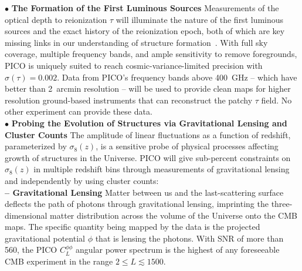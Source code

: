 \documentclass[PICOAPC.tex]{subfiles}
\begin{document}
 
$\bullet$ {\bf The Formation of the First Luminous Sources} \hspace{0.1in} \label{sec:luminoussources}  Measurements of the optical depth to reionization $\tau$ will illuminate the nature of the first luminous sources and the exact history of the reionization epoch, both of which are key missing links in our understanding of structure formation~\citep{alvarez_swp}.  With full sky coverage, multiple frequency bands, and ample sensitivity to remove foregrounds, PICO is uniquely suited to reach cosmic-variance-limited precision with $\sigma(\tau)=0.002$. Data from PICO's frequency bands above 400~GHz -- which have better than 2~arcmin resolution  -- will be used to provide clean maps for higher resolution ground-based instruments that can reconstruct the patchy $\tau$ field. No other experiment can provide these data. \\
%
$\bullet$ {\bf Probing the Evolution of Structures via Gravitational Lensing and Cluster Counts} \hspace{0.1in} \label{sec:gravitationallensing}   
The amplitude of linear fluctuations as a function of redshift, parameterized by $\sigma_8(z)$, is a sensitive probe of physical processes affecting growth of structures in the Universe. PICO will give sub-percent constraints on $\sigma_8(z)$ in multiple redshift bins through measurements of gravitational lensing and independently by using cluster counts:\\
{\bf -- Gravitational Lensing} \hspace{0.1in} \label{lensing} Matter between us and the last-scattering surface deflects the path of photons through gravitational lensing, imprinting the three-dimensional matter distribution across the volume of the Universe onto the CMB maps. The specific quantity being mapped by the data is the projected gravitational potential $\phi$ that is lensing the photons. With \ac{SNR} of more than 560, the PICO $C_{L}^{\phi \phi}$ angular power spectrum is the highest of any foreseeable CMB experiment in the range $2 \leq L \lesssim 1500$. 
\end{document}
